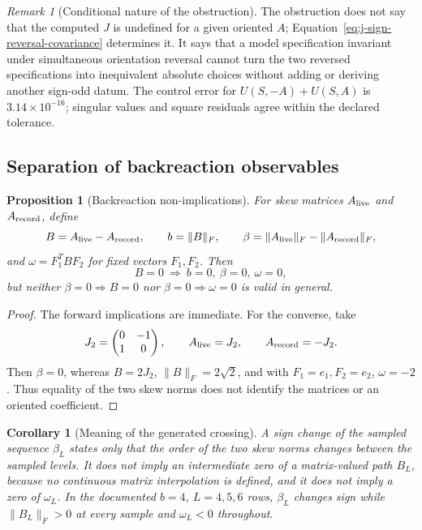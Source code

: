 \documentclass[11pt]{article}
\newtheorem{proposition}[definition]{Proposition}
\newtheorem{corollary}[definition]{Corollary}
\theoremstyle{remark}
\newtheorem{remark}[definition]{Remark}
\numberwithin{equation}{section}
\begin{document}
\begin{remark}[Conditional nature of the obstruction]
The obstruction does not say that the computed \(J\) is undefined for a given oriented \(A\); Equation~\eqref{eq:j-sign-reversal-covariance} determines it. It says that a model specification invariant under simultaneous orientation reversal cannot turn the two reversed specifications into inequivalent absolute choices without adding or deriving another sign-odd datum. The control error for \(U(S,-A)+U(S,A)\) is \(3.14\times10^{-16}\); singular values and square residuals agree within the declared tolerance.
\end{remark}

\subsection{Separation of backreaction observables}
\begin{proposition}[Backreaction non-implications]\label{prop:backreaction-nonimplications}
For skew matrices \(A_{\rm live}\) and \(A_{\rm record}\), define
\[
 B=A_{\rm live}-A_{\rm record},\qquad
 b=\|B\|_F,\qquad
 \beta=\|A_{\rm live}\|_F-\|A_{\rm record}\|_F,
\]
and \(\omega=F_1^TBF_2\) for fixed vectors \(F_1,F_2\). Then
\[
 B=0\ \Longrightarrow\ b=0,\ \beta=0,\ \omega=0,
\]
but neither \(\beta=0\Rightarrow B=0\) nor \(\beta=0\Rightarrow\omega=0\) is valid in general.
\end{proposition}

\begin{proof}
The forward implications are immediate. For the converse, take
\[
 J_2=\begin{pmatrix}0&-1\\1&0\end{pmatrix},\qquad
 A_{\rm live}=J_2,\qquad A_{\rm record}=-J_2.
\]
Then \(\beta=0\), whereas \(B=2J_2\), \(\|B\|_F=2\sqrt2\), and with \(F_1=e_1,F_2=e_2\), \(\omega=-2\). Thus equality of the two skew norms does not identify the matrices or an oriented coefficient.
\end{proof}

\begin{corollary}[Meaning of the generated crossing]\label{cor:beta-crossing-only}
A sign change of the sampled sequence \(\beta_L\) states only that the order of the two skew norms changes between the sampled levels. It does not imply an intermediate zero of a matrix-valued path \(B_L\), because no continuous matrix interpolation is defined, and it does not imply a zero of \(\omega_L\). In the documented \(b=4\), \(L=4,5,6\) rows, \(\beta_L\) changes sign while \(\|B_L\|_F>0\) at every sample and \(\omega_L<0\) throughout.
\end{corollary}
\end{document}
